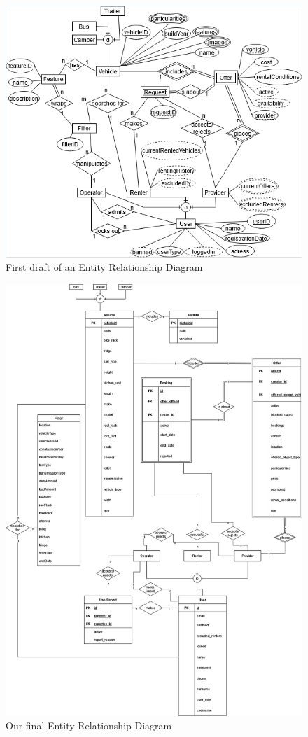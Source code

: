 \begin{figure}[h]
	\centering
	\includegraphics[width=12cm]{resources/images/ER-diagram_first.png}
	\caption{First draft of an Entity Relationship Diagram}
	\label{fig:er-diagram_draft}
\end{figure}

\begin{figure}[h]
	\centering
	\includegraphics[width=15cm]{resources/images/ER-diagram_final.png}
	\caption{Our final Entity Relationship Diagram}
	\label{fig:er-diagram}
\end{figure}

